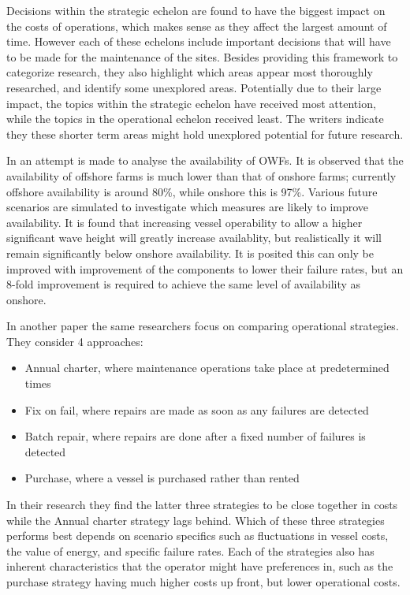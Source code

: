 \documentclass[a4paper,12pt]{article}
\begin{document}
Decisions within the strategic echelon are found to have the biggest impact on the costs of operations, which makes sense as they affect the largest amount of time. However each of these echelons include important decisions that will have to be made for the maintenance of the sites. Besides providing this framework to categorize research, they also highlight which areas appear most thoroughly researched, and identify some unexplored areas. Potentially due to their large impact, the topics within the strategic echelon have received most attention, while the topics in the operational echelon received least. The writers indicate they these shorter term areas might hold unexplored potential for future research. 

\bigskip

In \cite{dinwoodie2012analysis} an attempt is made to analyse the availability of OWFs. It is observed that the availability of offshore farms is much lower than that of onshore farms; currently offshore availability is around 80\%, while onshore this is 97\%. Various future scenarios are simulated to investigate which measures are likely to improve availability. It is found that increasing vessel operability to allow a higher significant wave height will greatly increase availablity, but realistically it will remain significantly below onshore availability. It is posited this can only be improved with improvement of the components to lower their failure rates, but an 8-fold improvement is required to achieve the same level of availability as onshore. 

In another paper \cite{dinwoodie2014operational} the same researchers focus on comparing operational strategies. They consider 4 approaches: 

\begin{itemize}
\item Annual charter, where maintenance operations take place at predetermined times
\item Fix on fail, where repairs are made as soon as any failures are detected
\item Batch repair, where repairs are done after a fixed number of failures is detected
\item Purchase, where a vessel is purchased rather than rented
\end{itemize}

In their research they find the latter three strategies to be close together in costs while the Annual charter strategy lags behind. Which of these three strategies performs best depends on scenario specifics such as fluctuations in vessel costs, the value of energy, and specific failure rates. Each of the strategies also has inherent characteristics that the operator might have preferences in, such as the purchase strategy having much higher costs up front, but lower operational costs. 
\end{document}
